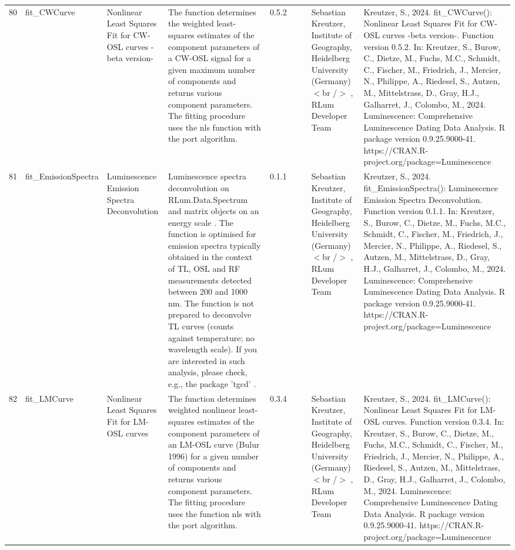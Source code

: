 \begin{table}[ht]
\begin{tabular}{rllllllll}
 \\ 
  80 & fit\_CWCurve & Nonlinear Least Squares Fit for CW-OSL curves -beta version- & The function determines the weighted least-squares estimates of the component parameters of a CW-OSL signal for a given maximum number of components and returns various component parameters. The fitting procedure uses the  nls  function with the  port  algorithm. & 0.5.2
 &  &  & Sebastian Kreutzer, Institute of Geography, Heidelberg University (Germany)$<$br /$>$ , RLum Developer Team & Kreutzer, S., 2024. fit\_CWCurve(): Nonlinear Least Squares Fit for CW-OSL curves -beta version-. Function version 0.5.2. In: Kreutzer, S., Burow, C., Dietze, M., Fuchs, M.C., Schmidt, C., Fischer, M., Friedrich, J., Mercier, N., Philippe, A., Riedesel, S., Autzen, M., Mittelstrass, D., Gray, H.J., Galharret, J., Colombo, M., 2024. Luminescence: Comprehensive Luminescence Dating Data Analysis. R package version 0.9.25.9000-41. https://CRAN.R-project.org/package=Luminescence
 \\ 
  81 & fit\_EmissionSpectra & Luminescence Emission Spectra Deconvolution & Luminescence spectra deconvolution on  RLum.Data.Spectrum  and  matrix  objects on an  energy scale . The function is optimised for emission spectra typically obtained in the context of TL, OSL and RF measurements detected between 200 and 1000 nm. The function is not prepared to deconvolve TL curves (counts against temperature; no wavelength scale). If you are interested in such analysis, please check, e.g., the package  'tgcd' . & 0.1.1
 &  &  & Sebastian Kreutzer, Institute of Geography, Heidelberg University (Germany)$<$br /$>$ , RLum Developer Team & Kreutzer, S., 2024. fit\_EmissionSpectra(): Luminescence Emission Spectra Deconvolution. Function version 0.1.1. In: Kreutzer, S., Burow, C., Dietze, M., Fuchs, M.C., Schmidt, C., Fischer, M., Friedrich, J., Mercier, N., Philippe, A., Riedesel, S., Autzen, M., Mittelstrass, D., Gray, H.J., Galharret, J., Colombo, M., 2024. Luminescence: Comprehensive Luminescence Dating Data Analysis. R package version 0.9.25.9000-41. https://CRAN.R-project.org/package=Luminescence
 \\ 
  82 & fit\_LMCurve & Nonlinear Least Squares Fit for LM-OSL curves & The function determines weighted nonlinear least-squares estimates of the component parameters of an LM-OSL curve (Bulur 1996) for a given number of components and returns various component parameters. The fitting procedure uses the function  nls  with the  port  algorithm. & 0.3.4
 &  &  & Sebastian Kreutzer, Institute of Geography, Heidelberg University (Germany)$<$br /$>$ , RLum Developer Team & Kreutzer, S., 2024. fit\_LMCurve(): Nonlinear Least Squares Fit for LM-OSL curves. Function version 0.3.4. In: Kreutzer, S., Burow, C., Dietze, M., Fuchs, M.C., Schmidt, C., Fischer, M., Friedrich, J., Mercier, N., Philippe, A., Riedesel, S., Autzen, M., Mittelstrass, D., Gray, H.J., Galharret, J., Colombo, M., 2024. Luminescence: Comprehensive Luminescence Dating Data Analysis. R package version 0.9.25.9000-41. https://CRAN.R-project.org/package=Luminescence

\end{tabular}
\end{table}
